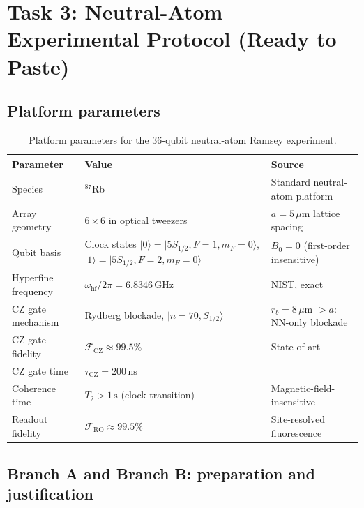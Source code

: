\documentclass[12pt,letterpaper]{article}
\theoremstyle{plain}
\theoremstyle{definition}
\begin{document}
\section{Task 3: Neutral-Atom Experimental Protocol (Ready to Paste)}
\label{sec:experiment}

\subsection{Platform parameters}

\begin{table}[h]
\centering\small
\caption{Platform parameters for the 36-qubit neutral-atom Ramsey experiment.}
\label{tab:platform}
\begin{tabular}{@{}p{3.5cm}p{5cm}p{3.5cm}@{}}
\toprule
Parameter & Value & Source \\
\midrule
Species & $^{87}$Rb & Standard neutral-atom platform \\
Array geometry & $6\times6$ in optical tweezers & $a = 5\,\mu$m lattice spacing \\
Qubit basis & Clock states $|0\rangle = |5S_{1/2},F=1,m_F=0\rangle$, $|1\rangle = |5S_{1/2},F=2,m_F=0\rangle$ & $B_0 = 0$ (first-order insensitive) \\
Hyperfine frequency & $\omega_{\mathrm{hf}}/2\pi = 6.8346\,\text{GHz}$ & NIST, exact \\
CZ gate mechanism & Rydberg blockade, $|n=70,S_{1/2}\rangle$ & $r_b = 8\,\mu$m $> a$: NN-only blockade \\
CZ gate fidelity & $\mathcal{F}_{\mathrm{CZ}} \approx 99.5\%$ & State of art~\cite{Saffman2016} \\
CZ gate time & $\tau_{\mathrm{CZ}} = 200\,\text{ns}$ & \\
Coherence time & $T_2 > 1\,\text{s}$ (clock transition) & Magnetic-field-insensitive \\
Readout fidelity & $\mathcal{F}_{\mathrm{RO}} \approx 99.5\%$ & Site-resolved fluorescence \\
\bottomrule
\end{tabular}
\end{table}

\subsection{Branch A and Branch B: preparation and justification}
\end{document}
